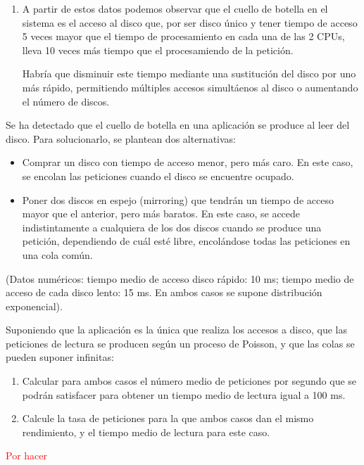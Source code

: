\begin{problem}[17]
\begin{enumerate}
\item

A partir de estos datos podemos observar que el cuello de botella en el sistema es el acceso al disco que, por ser disco único y tener tiempo de acceso 5 veces mayor que el tiempo de procesamiento en cada una de las 2 CPUs, lleva 10 veces más tiempo que el procesamiendo de la petición.

Habría que disminuir este tiempo mediante una sustitución del disco por uno más rápido, permitiendo múltiples accesos simultáenos al disco o aumentando el número de discos.

\end{enumerate}

\end{problem}

\begin{problem}[18]\label{tema2:prob18}
Se ha detectado que el cuello de botella en una aplicación se produce al leer del disco. Para solucionarlo, se plantean dos alternativas:
\begin{itemize}
\item Comprar un disco con tiempo de acceso menor, pero más caro. En este caso, se encolan las peticiones cuando el disco se encuentre ocupado.
\item Poner dos discos en espejo (mirroring) que tendrán un tiempo de acceso mayor que el anterior, pero más baratos. En este caso, se accede indistintamente a cualquiera de los dos discos cuando se produce una petición, dependiendo de cuál esté libre, encolándose todas las peticiones en una cola común.
\end{itemize}
(Datos numéricos: tiempo medio de acceso disco rápido: 10 ms; tiempo medio de acceso de cada disco lento: 15 ms. En ambos casos se supone distribución exponencial).

Suponiendo que la aplicación es la única que realiza los accesos a disco, que las peticiones de lectura se producen según un proceso de Poisson, y que las colas se pueden suponer infinitas:
\begin{enumerate}
\item Calcular para ambos casos el número medio de peticiones por segundo que se podrán satisfacer para obtener un tiempo medio de lectura igual a 100 ms.
\item Calcule la tasa de peticiones para la que ambos casos dan el mismo rendimiento, y el tiempo medio de lectura para este caso.
\end{enumerate}

\solution

\textcolor{red}{Por hacer}

\end{problem}

